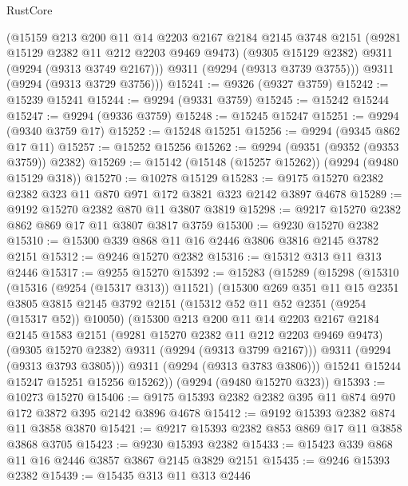 \begin{lexlean}{RustCore}
\begin{coremodule}
        (@15159
          @213
          @200
          @11
          @14
          @2203
          @2167
          @2184
          @2145
          @3748
          @2151
          (@9281 @15129 @2382 @11 @212 @2203 @9469 @9473)
          (@9305 @15129 @2382)
          @9311
          (@9294 (@9313 @3749 @2167)))
        @9311
        (@9294 (@9313 @3739 @3755)))
      @9311
      (@9294 (@9313 @3729 @3756)))
@15241 := @9326 (@9327 @3759)
@15242 := @15239 @15241
@15244 := @9294 (@9331 @3759)
@15245 := @15242 @15244
@15247 := @9294 (@9336 @3759)
@15248 := @15245 @15247
@15251 := @9294 (@9340 @3759 @17)
@15252 := @15248 @15251
@15256 := @9294 (@9345 @862 @17 @11)
@15257 := @15252 @15256
@15262 := @9294 (@9351 (@9352 (@9353 @3759)) @2382)
@15269 := @15142 (@15148 (@15257 @15262)) (@9294 (@9480 @15129 @318))
@15270 := @10278 @15129
@15283 := @9175 @15270 @2382 @2382 @323 @11 @870 @971 @172 @3821 @323 @2142 @3897 @4678
@15289 := @9192 @15270 @2382 @870 @11 @3807 @3819
@15298 := @9217 @15270 @2382 @862 @869 @17 @11 @3807 @3817 @3759
@15300 := @9230 @15270 @2382
@15310 := @15300 @339 @868 @11 @16 @2446 @3806 @3816 @2145 @3782 @2151
@15312 := @9246 @15270 @2382
@15316 := @15312 @313 @11 @313 @2446
@15317 := @9255 @15270
@15392 := @15283
    (@15289
      (@15298
        (@15310
          (@15316 (@9254 (@15317 @313)) @11521)
          (@15300
            @269
            @351
            @11
            @15
            @2351
            @3805
            @3815
            @2145
            @3792
            @2151
            (@15312 @52 @11 @52 @2351 (@9254 (@15317 @52)) @10050)
            (@15300
              @213
              @200
              @11
              @14
              @2203
              @2167
              @2184
              @2145
              @1583
              @2151
              (@9281 @15270 @2382 @11 @212 @2203 @9469 @9473)
              (@9305 @15270 @2382)
              @9311
              (@9294 (@9313 @3799 @2167)))
            @9311
            (@9294 (@9313 @3793 @3805)))
          @9311
          (@9294 (@9313 @3783 @3806)))
        @15241
        @15244
        @15247
        @15251
        @15256
        @15262))
    (@9294 (@9480 @15270 @323))
@15393 := @10273 @15270
@15406 := @9175 @15393 @2382 @2382 @395 @11 @874 @970 @172 @3872 @395 @2142 @3896 @4678
@15412 := @9192 @15393 @2382 @874 @11 @3858 @3870
@15421 := @9217 @15393 @2382 @853 @869 @17 @11 @3858 @3868 @3705
@15423 := @9230 @15393 @2382
@15433 := @15423 @339 @868 @11 @16 @2446 @3857 @3867 @2145 @3829 @2151
@15435 := @9246 @15393 @2382
@15439 := @15435 @313 @11 @313 @2446

\end{coremodule}
\end{lexlean}
